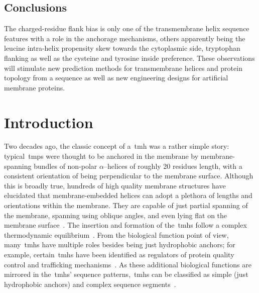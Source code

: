 \subsection{Conclusions}

The charged-residue flank bias is only one of the transmembrane helix sequence features with a role in the anchorage mechanisms, others apparently being the leucine intra-helix propensity skew towards the cytoplasmic side, tryptophan flanking as well as the cysteine and tyrosine inside preference.
These observations will stimulate new prediction methods for transmembrane helices and protein topology from a sequence as well as new engineering designs for artificial membrane proteins.

\section{Introduction}

Two decades ago, the classic concept of a~\gls{tmh} was a rather simple story: typical~\gls{tmp}s were thought to be anchored in the membrane by membrane-spanning bundles of non-polar \(\alpha\)--helices of roughly 20 residues length, with a consistent orientation of being perpendicular to the membrane surface.
Although this is broadly true, hundreds of high quality membrane structures have elucidated that membrane-embedded helices can adopt a plethora of lengths and orientations within the membrane.
They are capable of just partial spanning of the membrane, spanning using oblique angles, and even lying flat on the membrane surface~\cite{Elofsson2007, VonHeijne2006}.
The insertion and formation of the~\gls{tmh}s follow a complex thermodynamic equilibrium~\cite{Moon2013, MacCallum2011, Cymer2015}.
From the biological function point of view, many~\gls{tmh}s have multiple roles besides being just hydrophobic anchors; for example, certain~\gls{tmh}s have been identified as regulators of protein quality control and trafficking mechanisms~\cite{Hessa2011}.
As these additional biological functions are mirrored in the~\gls{tmh}s’ sequence patterns,~\gls{tmh}s can be classified as simple (just hydrophobic anchors) and complex sequence segments~\cite{Wong2010, Wong2011, Wong2012}.

